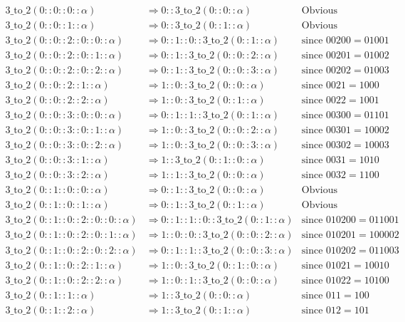 \documentclass{cs4rep}
\begin{document}
\[ \begin{array}{lll}
\mbox{3\_to\_2}(0::0::0::\alpha) & \Rightarrow 0::\mbox{3\_to\_2}(0::0::\alpha) & \mbox{Obvious}\\
\mbox{3\_to\_2}(0::0::1::\alpha) & \Rightarrow 0::\mbox{3\_to\_2}(0::1::\alpha) & \mbox{Obvious}\\
\mbox{3\_to\_2}(0::0::2::0::0::\alpha) & \Rightarrow 0::1::0::\mbox{3\_to\_2}(0::1::\alpha) & \mbox{since } 00200=01001\\
\mbox{3\_to\_2}(0::0::2::0::1::\alpha) & \Rightarrow 0::1::\mbox{3\_to\_2}(0::0::2::\alpha) & \mbox{since } 00201=01002\\
\mbox{3\_to\_2}(0::0::2::0::2::\alpha) & \Rightarrow 0::1::\mbox{3\_to\_2}(0::0::3::\alpha) & \mbox{since } 00202=01003\\
\mbox{3\_to\_2}(0::0::2::1::\alpha) & \Rightarrow 1::0::\mbox{3\_to\_2}(0::0::\alpha) & \mbox{since } 0021=1000\\
\mbox{3\_to\_2}(0::0::2::2::\alpha) & \Rightarrow 1::0::\mbox{3\_to\_2}(0::1::\alpha) & \mbox{since } 0022=1001\\
\mbox{3\_to\_2}(0::0::3::0::0::\alpha) & \Rightarrow 0::1::1::\mbox{3\_to\_2}(0::1::\alpha) & \mbox{since } 00300=01101\\
\mbox{3\_to\_2}(0::0::3::0::1::\alpha) & \Rightarrow 1::0::\mbox{3\_to\_2}(0::0::2::\alpha) & \mbox{since } 00301=10002\\
\mbox{3\_to\_2}(0::0::3::0::2::\alpha) & \Rightarrow 1::0::\mbox{3\_to\_2}(0::0::3::\alpha) & \mbox{since } 00302=10003\\
\mbox{3\_to\_2}(0::0::3::1::\alpha) & \Rightarrow 1::\mbox{3\_to\_2}(0::1::0::\alpha) & \mbox{since } 0031=1010\\
\mbox{3\_to\_2}(0::0::3::2::\alpha) & \Rightarrow 1::1::\mbox{3\_to\_2}(0::0::\alpha) & \mbox{since } 0032=1100\\
\mbox{3\_to\_2}(0::1::0::0::\alpha) & \Rightarrow 0::1::\mbox{3\_to\_2}(0::0::\alpha) & \mbox{Obvious}\\
\mbox{3\_to\_2}(0::1::0::1::\alpha) & \Rightarrow 0::1::\mbox{3\_to\_2}(0::1::\alpha) & \mbox{Obvious}\\
\mbox{3\_to\_2}(0::1::0::2::0::0::\alpha) & \Rightarrow 0::1::1::0::\mbox{3\_to\_2}(0::1::\alpha) & \mbox{since } 010200=011001\\
\mbox{3\_to\_2}(0::1::0::2::0::1::\alpha) & \Rightarrow 1::0::0::\mbox{3\_to\_2}(0::0::2::\alpha) & \mbox{since } 010201=100002\\
\mbox{3\_to\_2}(0::1::0::2::0::2::\alpha) & \Rightarrow 0::1::1::\mbox{3\_to\_2}(0::0::3::\alpha) & \mbox{since } 010202=011003\\
\mbox{3\_to\_2}(0::1::0::2::1::\alpha) & \Rightarrow 1::0::\mbox{3\_to\_2}(0::1::0::\alpha) & \mbox{since } 01021=10010\\
\mbox{3\_to\_2}(0::1::0::2::2::\alpha) & \Rightarrow 1::0::1::\mbox{3\_to\_2}(0::0::\alpha) & \mbox{since } 01022=10100\\
\mbox{3\_to\_2}(0::1::1::\alpha) & \Rightarrow 1::\mbox{3\_to\_2}(0::0::\alpha) & \mbox{since } 011=100\\
\mbox{3\_to\_2}(0::1::2::\alpha) & \Rightarrow 1::\mbox{3\_to\_2}(0::1::\alpha) & \mbox{since } 012 = 101
\end{array} \]
\end{document}
